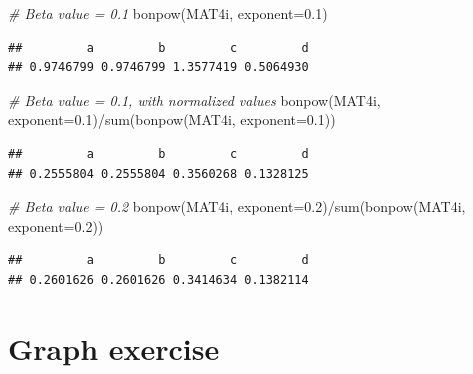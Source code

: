 \documentclass[
  notitlepage,
  onecolumn,
  openany]{book}
\newenvironment{Shaded}{\begin{snugshade}}{\end{snugshade}}
\newcommand{\AttributeTok}[1]{\textcolor[rgb]{0.77,0.63,0.00}{#1}}
\newcommand{\CommentTok}[1]{\textcolor[rgb]{0.56,0.35,0.01}{\textit{#1}}}
\newcommand{\FloatTok}[1]{\textcolor[rgb]{0.00,0.00,0.81}{#1}}
\newcommand{\FunctionTok}[1]{\textcolor[rgb]{0.00,0.00,0.00}{#1}}
\newcommand{\NormalTok}[1]{#1}
\newcommand{\SpecialCharTok}[1]{\textcolor[rgb]{0.00,0.00,0.00}{#1}}
\begin{document}
\begin{Shaded}
\begin{Highlighting}[]
\CommentTok{\# Beta value = 0.1}
\FunctionTok{bonpow}\NormalTok{(MAT4i, }\AttributeTok{exponent=}\FloatTok{0.1}\NormalTok{)}
\end{Highlighting}
\end{Shaded}

\begin{verbatim}
##         a         b         c         d 
## 0.9746799 0.9746799 1.3577419 0.5064930
\end{verbatim}

\begin{Shaded}
\begin{Highlighting}[]
\CommentTok{\# Beta value = 0.1, with normalized values}
\FunctionTok{bonpow}\NormalTok{(MAT4i, }\AttributeTok{exponent=}\FloatTok{0.1}\NormalTok{)}\SpecialCharTok{/}\FunctionTok{sum}\NormalTok{(}\FunctionTok{bonpow}\NormalTok{(MAT4i, }\AttributeTok{exponent=}\FloatTok{0.1}\NormalTok{))}
\end{Highlighting}
\end{Shaded}

\begin{verbatim}
##         a         b         c         d 
## 0.2555804 0.2555804 0.3560268 0.1328125
\end{verbatim}

\begin{Shaded}
\begin{Highlighting}[]
\CommentTok{\# Beta value = 0.2}
\FunctionTok{bonpow}\NormalTok{(MAT4i, }\AttributeTok{exponent=}\FloatTok{0.2}\NormalTok{)}\SpecialCharTok{/}\FunctionTok{sum}\NormalTok{(}\FunctionTok{bonpow}\NormalTok{(MAT4i, }\AttributeTok{exponent=}\FloatTok{0.2}\NormalTok{))}
\end{Highlighting}
\end{Shaded}

\begin{verbatim}
##         a         b         c         d 
## 0.2601626 0.2601626 0.3414634 0.1382114
\end{verbatim}

\hypertarget{graph-exercise}{%
\section{Graph exercise}\label{graph-exercise}}
\end{document}
